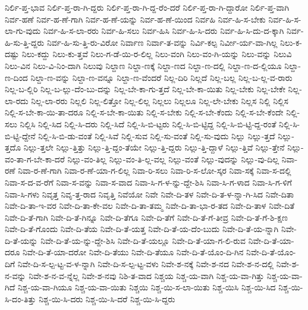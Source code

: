 {ನಿರ್ಲಿ-ಪ್ತ-ಭಾವ
ನಿರ್ಲಿ-ಪ್ತ-ರಾ-ಗಿ-ದ್ದರು
ನಿರ್ಲಿ-ಪ್ತ-ರಾ-ಗಿ-ದ್ದ-ರೆಂ-ದರೆ
ನಿರ್ಲಿ-ಪ್ತ-ರಾ-ಗಿ-ದ್ದಾರೋ
ನಿರ್ಲಿ-ಪ್ತ-ವಾಗಿ
ನಿರ್ವ-ಹಣೆ
ನಿರ್ವ-ಹ-ಣೆ-ಗಾಗಿ
ನಿರ್ವ-ಹ-ಣೆ-ಯನ್ನು
ನಿರ್ವ-ಹ-ಣೆ-ಯಿಂದ
ನಿರ್ವಹಿ
ನಿರ್ವ-ಹಿ-ಸ-ಬೇಕು
ನಿರ್ವ-ಹಿ-ಸ-ಲಾ-ಗು-ವುದು
ನಿರ್ವ-ಹಿ-ಸ-ಲಾ-ರರು
ನಿರ್ವ-ಹಿ-ಸಲು
ನಿರ್ವ-ಹಿಸಿ
ನಿರ್ವ-ಹಿ-ಸಿ-ದರು
ನಿರ್ವ-ಹಿ-ಸಿ-ದು-ದ-ಕ್ಕಾಗಿ
ನಿರ್ವ-ಹಿ-ಸು-ತ್ತಿ-ದ್ದರು
ನಿರ್ವ-ಹಿ-ಸು-ತ್ತಿ-ರು-ವಿರೋ
ನಿರ್ವಾಣ
ನಿರ್ವಾ-ತ-ವನ್ನು
ನಿರ್ವಿ-ಕಲ್ಪ
ನಿರ್ವೀ-ರ್ಯ-ವಾ-ಗಿಲ್ಲ
ನಿಲು-ಕ-ದಷ್ಟು
ನಿಲು-ಕದ್ದು
ನಿಲು-ಕು-ತ್ತವೆ
ನಿಲು-ಗ-ಡೆ-ಯಿ-ರ-ಲಿಲ್ಲ
ನಿಲು-ವಂಗಿ
ನಿಲು-ವಂ-ಗಿ-ಯನ್ನು
ನಿಲು-ವನ್ನು
ನಿಲುವಿ
ನಿಲು-ವಿನ
ನಿಲು-ವಿ-ನಿಂ-ದಾಗಿ
ನಿಲುವು
ನಿಲ್ದಾಣ
ನಿಲ್ದಾ-ಣಕ್ಕೆ
ನಿಲ್ದಾ-ಣದ
ನಿಲ್ದಾ-ಣ-ದಲ್ಲಿ
ನಿಲ್ದಾ-ಣ-ದ-ಲ್ಲಿಯೂ
ನಿಲ್ದಾ-ಣ-ದಿಂದ
ನಿಲ್ದಾ-ಣ-ವನ್ನು
ನಿಲ್ದಾ-ಣ-ವನ್ನೂ
ನಿಲ್ದಾ-ಣ-ವೆಂದರೆ
ನಿಲ್ಲ-ದಿರಿ
ನಿಲ್ಲದೆ
ನಿಲ್ಲ-ಬಲ್ಲ
ನಿಲ್ಲ-ಬ-ಲ್ಲ-ವ-ರಾರು
ನಿಲ್ಲ-ಬ-ಲ್ಲಿರಿ
ನಿಲ್ಲ-ಬ-ಲ್ಲು-ದೆಂ-ಬು-ದನ್ನು
ನಿಲ್ಲ-ಬೇ-ಕಾ-ಗು-ತ್ತದೆ
ನಿಲ್ಲ-ಬೇ-ಕಾ-ಯಿತು
ನಿಲ್ಲ-ಬೇಕು
ನಿಲ್ಲ-ಬೇಕೇ
ನಿಲ್ಲ-ಲಾ-ರದು
ನಿಲ್ಲ-ಲಾ-ರರು
ನಿಲ್ಲಲಿ
ನಿಲ್ಲ-ಲಿತ್ತೋ
ನಿಲ್ಲ-ಲಿಲ್ಲ
ನಿಲ್ಲಲು
ನಿಲ್ಲಲೂ
ನಿಲ್ಲ-ಲೇ-ಬೇಕು
ನಿಲ್ಲಸ
ನಿಲ್ಲಿ
ನಿಲ್ಲಿಸ
ನಿಲ್ಲಿ-ಸ-ಬೇ-ಕಾ-ಯಿ-ತಾ-ದರೂ
ನಿಲ್ಲಿ-ಸ-ಬೇ-ಕಾ-ಯಿತು
ನಿಲ್ಲಿ-ಸ-ಬೇಕು
ನಿಲ್ಲಿ-ಸ-ಬೇ-ಕೆಂದು
ನಿಲ್ಲಿ-ಸ-ಬೇ-ಕೆಂದೇ
ನಿಲ್ಲಿ-ಸಲು
ನಿಲ್ಲಿಸಿ
ನಿಲ್ಲಿ-ಸಿದ
ನಿಲ್ಲಿ-ಸಿ-ದರು
ನಿಲ್ಲಿ-ಸಿದೆ
ನಿಲ್ಲಿ-ಸಿ-ಬಿ-ಟ್ಟರು
ನಿಲ್ಲಿ-ಸಿ-ಬಿ-ಟ್ಟಿದ್ದ
ನಿಲ್ಲಿ-ಸಿ-ಬಿ-ಟ್ಟಿ-ದ್ದ-ರಂತೆ
ನಿಲ್ಲಿ-ಸಿ-ಬಿ-ಟ್ಟಿ-ದ್ದೇನೆ
ನಿಲ್ಲಿ-ಸಿ-ಬಿ-ಡು-ವಂತೆ
ನಿಲ್ಲಿ-ಸಿವೆ
ನಿಲ್ಲಿ-ಸುವ
ನಿಲ್ಲಿ-ಸು-ವಂತೆ
ನಿಲ್ಲಿ-ಸು-ವುದು
ನಿಲ್ಲು
ನಿಲ್ಲು-ತ್ತದೆ
ನಿಲ್ಲು-ತ್ತದೊ
ನಿಲ್ಲು-ತ್ತಲೇ
ನಿಲ್ಲು-ತ್ತಿತ್ತು
ನಿಲ್ಲು-ತ್ತಿ-ದ್ದಂ-ತೆಯೇ
ನಿಲ್ಲು-ತ್ತಿ-ದ್ದರು
ನಿಲ್ಲು-ತ್ತಿ-ದ್ದಾಳೆ
ನಿಲ್ಲು-ತ್ತಿವೆ
ನಿಲ್ಲು-ತ್ತೇನೆ
ನಿಲ್ಲು-ವಂ-ತಾ-ಗ-ಬೇ-ಕಾ-ದರೆ
ನಿಲ್ಲು-ವಂ-ತಿಲ್ಲ
ನಿಲ್ಲು-ವಂ-ತಿ-ಲ್ಲ-ವಲ್ಲ
ನಿಲ್ಲು-ವಂತೆ
ನಿಲ್ಲು-ವುದನ್ನು
ನಿಲ್ಲು-ವು-ದಿಲ್ಲ
ನಿವಾ-ರಣೆ
ನಿವಾ-ರ-ಣೆ-ಗಾಗಿ
ನಿವಾ-ರ-ಣೆ-ಯಾ-ಗ-ಲಿಲ್ಲ
ನಿವಾ-ರಿ-ಸಲು
ನಿವಾ-ರಿ-ಸ-ಲೋ-ಸ್ಕರ
ನಿವಾ-ಸಕ್ಕೆ
ನಿವಾ-ಸ-ದಲ್ಲಿ
ನಿವಾ-ಸ-ದ-ವ-ರೆಗೆ
ನಿವಾ-ಸ-ವನ್ನು
ನಿವಾ-ಸ-ವಾದ
ನಿವಾ-ಸಿ-ಗ-ಳ-ನ್ನು-ದ್ದೇ-ಶಿಸಿ
ನಿವಾ-ಸಿ-ಗ-ಳಾದ
ನಿವಾ-ಸಿ-ಗ-ಳಿಗೆ
ನಿವಾ-ಸಿ-ಗಳು
ನಿವೃತ್ತ
ನಿವೃ-ತ್ತ-ರಾದ
ನಿವೃತ್ತಿ
ನಿವೆಯೋ
ನಿವೇ
ನಿವೇ-ದಿ-ತಳ
ನಿವೇ-ದಿ-ತ-ಳ-ನ್ನಾ-ಗಿ-ಸಿದ
ನಿವೇ-ದಿತಾ
ನಿವೇ-ದಿ-ತಾ-ಇ-ವರ
ನಿವೇ-ದಿ-ತಾ-ಕೇ-ವಲ
ನಿವೇ-ದಿ-ತಾ-ತಮ್ಮ
ನಿವೇ-ದಿ-ತಾ-ಭಾ-ರ-ತದ
ನಿವೇ-ದಿ-ತಾಳ
ನಿವೇ-ದಿತೆ
ನಿವೇ-ದಿ-ತೆ-ಗಾಗಿ
ನಿವೇ-ದಿ-ತೆ-ಗಿನ್ನೂ
ನಿವೇ-ದಿ-ತೆಗೂ
ನಿವೇ-ದಿ-ತೆಗೆ
ನಿವೇ-ದಿ-ತೆ-ಗೆ-ತೀವ್ರ
ನಿವೇ-ದಿ-ತೆ-ಗೆ-ಶಿ-ಕ್ಷಣ
ನಿವೇ-ದಿ-ತೆ-ಗೊಂದು
ನಿವೇ-ದಿ-ತೆಯ
ನಿವೇ-ದಿ-ತೆ-ಯತ್ತ
ನಿವೇ-ದಿ-ತೆ-ಯ-ದೆಂ-ಬುದು
ನಿವೇ-ದಿ-ತೆ-ಯ-ನ್ನಾಗಿ
ನಿವೇ-ದಿ-ತೆ-ಯನ್ನು
ನಿವೇ-ದಿ-ತೆ-ಯ-ನ್ನು-ದ್ದೇ-ಶಿಸಿ
ನಿವೇ-ದಿ-ತೆ-ಯಲ್ಲೂ
ನಿವೇ-ದಿ-ತೆ-ಯಾ-ಗ-ಲಿ-ರುವ
ನಿವೇ-ದಿ-ತೆ-ಯಾ-ದರೂ
ನಿವೇ-ದಿ-ತೆ-ಯಾ-ದರೋ
ನಿವೇ-ದಿ-ತೆಯು
ನಿವೇ-ದಿ-ತೆಯೂ
ನಿವೇ-ದಿ-ತೆ-ಯೊಂ-ದಿ-ಗಿನ
ನಿವೇ-ದಿ-ತೆ-ಯೊಂ-ದಿಗೆ
ನಿವೇ-ದಿ-ಸ-ಲ್ಪ-ಟ್ಟ-ವ-ಳ-ನ್ನಾಗಿ
ನಿವೇ-ದಿ-ಸ-ಲ್ಪ-ಟ್ಟ-ವಳು
ನಿವೇ-ಶ-ನಕ್ಕೆ
ನಿವೇ-ಶ-ನದ
ನಿವೇ-ಶ-ನ-ದಲ್ಲಿ
ನಿವೇ-ಶ-ನ-ವನ್ನು
ನಿವೇ-ಶ-ನ-ವ-ನ್ನೆಲ್ಲ
ನಿವೇ-ಶ-ನವು
ನಿಶಿ-ತ-ವಾದ
ನಿಶ್ಚಯ
ನಿಶ್ಚ-ಯ-ವಾಗಿ
ನಿಶ್ಚ-ಯ-ವಾ-ಗಿತ್ತು
ನಿಶ್ಚ-ಯ-ವಾ-ಗಿದೆ
ನಿಶ್ಚ-ಯ-ವಾ-ಗಿಯೂ
ನಿಶ್ಚ-ಯ-ವಾ-ಯಿತು
ನಿಶ್ಚಯಿ
ನಿಶ್ಚ-ಯಿ-ಸ-ಲಾ-ಯಿತು
ನಿಶ್ಚ-ಯಿಸಿ
ನಿಶ್ಚ-ಯಿ-ಸಿದ
ನಿಶ್ಚ-ಯಿ-ಸಿ-ದಂ-ತಿತ್ತು
ನಿಶ್ಚ-ಯಿ-ಸಿ-ದರು
ನಿಶ್ಚ-ಯಿ-ಸಿ-ದರೆ
ನಿಶ್ಚ-ಯಿ-ಸಿ-ದ್ದರು
}
